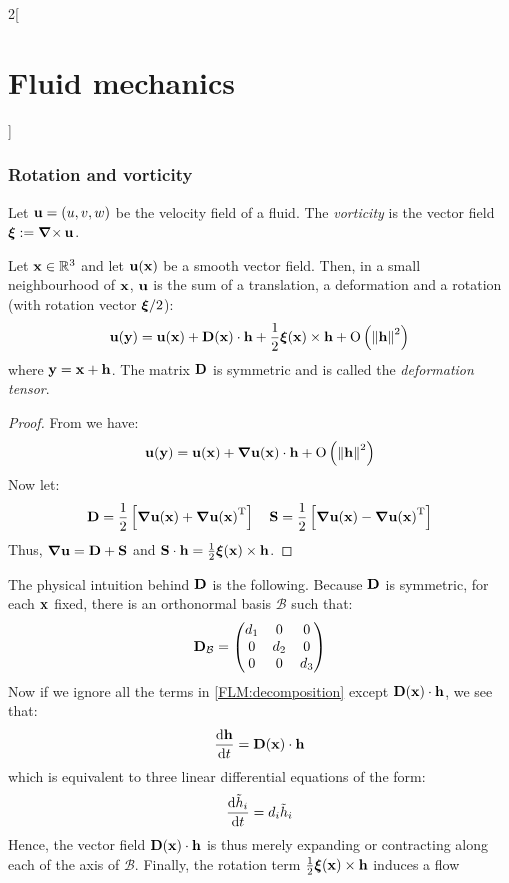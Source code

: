 \documentclass[../../../main_physics.tex]{subfiles}
\begin{document}
\begin{multicols}{2}[\section{Fluid mechanics}]
  \subsubsection{Rotation and vorticity}
  \begin{definition}
    Let $\vf{u}=(u,v,w)$ be the velocity field of a fluid. The \emph{vorticity} is the vector field $\vf{\xi}:=\rotp\vf{u}$.
  \end{definition}
  \begin{proposition}
    Let $\vf{x}\in \RR^3$ and let $\vf{u}(\vf{x})$ be a smooth vector field. Then, in a small neighbourhood of $\vf{x}$, $\vf{u}$ is the sum of a translation, a deformation and a rotation (with rotation vector $\vf\xi/2$):
    \begin{equation}\label{FLM:decomposition}
      \vf{u}(\vf{y})=\vf{u}(\vf{x})+\vf{D}(\vf{x})\cdot \vf{h}+\frac{1}{2} \vf{\xi}(\vf{x})\times \vf{h} +\O{\norm{\vf{h}}^2}
    \end{equation}
    where $\vf{y}=\vf{x}+\vf{h}$. The matrix $\vf{D}$ is symmetric and is called the \emph{deformation tensor}.
  \end{proposition}
  \begin{proof}
    From  we have:
    $$
      \vf{u}(\vf{y})=\vf{u}(\vf{x})+\grad\vf{u}(\vf{x})\cdot \vf{h}+\O{\norm{\vf{h}}^2}
    $$
    Now let:
    $$
      \vf{D}=\frac{1}{2}\left[\grad\vf{u}(\vf{x})+\transpose{\grad\vf{u}(\vf{x})}\right]\quad \vf{S}=\frac{1}{2}\left[\grad\vf{u}(\vf{x})-\transpose{\grad\vf{u}(\vf{x})}\right]
    $$
    Thus, $\grad\vf{u} = \vf{D}+\vf{S}$ and $\vf{S}\cdot\vf{h} = \frac{1}{2} \vf{\xi}(\vf{x})\times \vf{h}$.
  \end{proof}
  \begin{remark}
    The physical intuition behind $\vf{D}$ is the following. Because $\vf{D}$ is symmetric, for each $\vf{x}$ fixed, there is an orthonormal basis $\mathcal{B}$ such that:
    $$
      \vf{D}_{\mathcal{B}}=\begin{pmatrix}
        d_1 & 0   & 0   \\
        0   & d_2 & 0   \\
        0   & 0   & d_3
      \end{pmatrix}
    $$
    Now if we ignore all the terms in \eqref{FLM:decomposition} except $\vf{D}(\vf{x})\cdot \vf{h}$, we see that:
    $$
      \dv{\vf{h}}{t}=\vf{D}(\vf{x})\cdot \vf{h}
    $$
    which is equivalent to three linear differential equations of the form:
    $$
      \dv{\tilde{h}_i}{t}=d_i \tilde{h}_i
    $$
    Hence, the vector field $\vf{D}(\vf{x})\cdot \vf{h}$ is thus merely expanding or contracting along each of the axis of $\mathcal{B}$. Finally, the rotation term $\frac{1}{2} \vf{\xi}(\vf{x})\times \vf{h}$ induces a flow

\end{remark}
\end{multicols}
\end{document}
